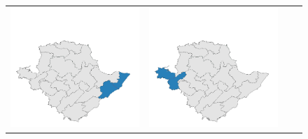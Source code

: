 \begin{figure}[p]
\begin{tabularx}{1\textwidth}{XXXX}
\includegraphics[width=1\linewidth]{images/ch6/mergeoverall/13}&
\includegraphics[width=1\linewidth]{images/ch6/mergeoverall/14}&

\end{tabularx}
\end{figure}
